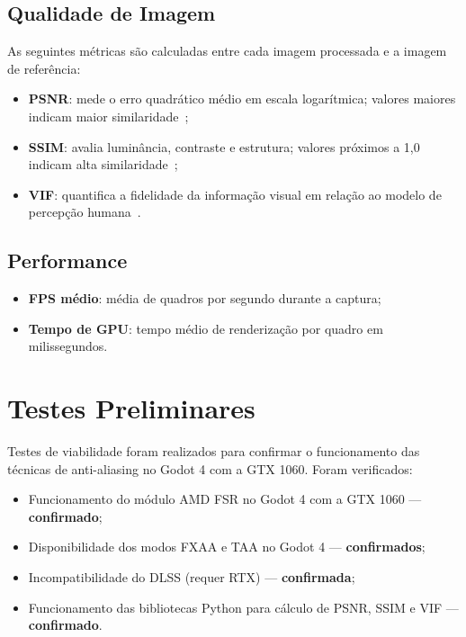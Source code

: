 \documentclass[twoside,english,brazilian]{UNISINOSmonografia}
\begin{document}
\subsection{Qualidade de Imagem}

As seguintes métricas são calculadas entre cada imagem processada e a imagem de referência:

\begin{itemize}
    \item \textbf{PSNR}: mede o erro quadrático médio em escala logarítmica; valores maiores indicam maior similaridade~\cite{hore2010psnr};
    \item \textbf{SSIM}: avalia luminância, contraste e estrutura; valores próximos a 1,0 indicam alta similaridade~\cite{wang2004ssim};
    \item \textbf{VIF}: quantifica a fidelidade da informação visual em relação ao modelo de percepção humana~\cite{sheikh2006vif}.
\end{itemize}

\subsection{Performance}

\begin{itemize}
    \item \textbf{FPS médio}: média de quadros por segundo durante a captura;
    \item \textbf{Tempo de GPU}: tempo médio de renderização por quadro em milissegundos.
\end{itemize}

\section{Testes Preliminares}

Testes de viabilidade foram realizados para confirmar o funcionamento das técnicas de anti-aliasing no Godot 4 com a GTX 1060. Foram verificados:

\begin{itemize}
    \item Funcionamento do módulo AMD FSR no Godot 4 com a GTX 1060 — \textbf{confirmado};
    \item Disponibilidade dos modos FXAA e TAA no Godot 4 — \textbf{confirmados};
    \item Incompatibilidade do DLSS (requer RTX) — \textbf{confirmada};
    \item Funcionamento das bibliotecas Python para cálculo de PSNR, SSIM e VIF — \textbf{confirmado}.
\end{itemize}
\end{document}
